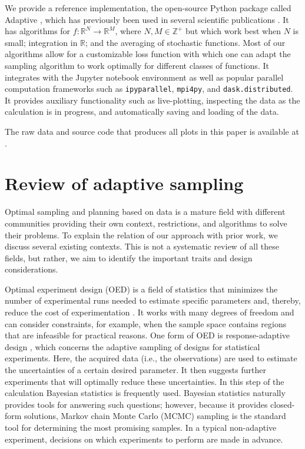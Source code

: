 
We provide a reference implementation, the open-source Python package called Adaptive \cite{Nijholt2019}, which has previously been used in several scientific publications \cite{Vuik2018, Laeven2019, Bommer2019, Melo2019}.
It has algorithms for $f \colon \mathbb{R}^N \to \mathbb{R}^M$, where $N, M \in \mathbb{Z}^+$ but which work best when $N$ is small; integration in $\mathbb{R}$; and the averaging of stochastic functions.
Most of our algorithms allow for a customizable loss function with which one can adapt the sampling algorithm to work optimally for different classes of functions.
It integrates with the Jupyter notebook environment as well as popular parallel computation frameworks such as \passthrough{\lstinline!ipyparallel!}, \passthrough{\lstinline!mpi4py!}, and \passthrough{\lstinline!dask.distributed!}.
It provides auxiliary functionality such as live-plotting, inspecting the data as the calculation is in progress, and automatically saving and loading of the data.

The raw data and source code that produces all plots in this paper is available at \cite{papercode}.

\hypertarget{sec:review}{%
\section{Review of adaptive sampling}\label{sec:review}}

Optimal sampling and planning based on data is a mature field with different communities providing their own context, restrictions, and algorithms to solve their problems.
To explain the relation of our approach with prior work, we discuss several existing contexts.
This is not a systematic review of all these fields, but rather, we aim to identify the important traits and design considerations.


Optimal experiment design (OED) is a field of statistics that minimizes the number of experimental runs needed to estimate specific parameters and, thereby, reduce the cost of experimentation \cite{Emery1998}.
It works with many degrees of freedom and can consider constraints, for example, when the sample space contains regions that are infeasible for practical reasons.
One form of OED is response-adaptive design \cite{Hu2006}, which concerns the adaptive sampling of designs for statistical experiments.
Here, the acquired data (i.e., the observations) are used to estimate the uncertainties of a certain desired parameter.
It then suggests further experiments that will optimally reduce these uncertainties.
In this step of the calculation Bayesian statistics is frequently used.
Bayesian statistics naturally provides tools for answering such questions; however, because it provides closed-form solutions, Markov chain Monte Carlo (MCMC) sampling is the standard tool for determining the most promising samples.
In a typical non-adaptive experiment, decisions on which experiments to perform are made in advance.


